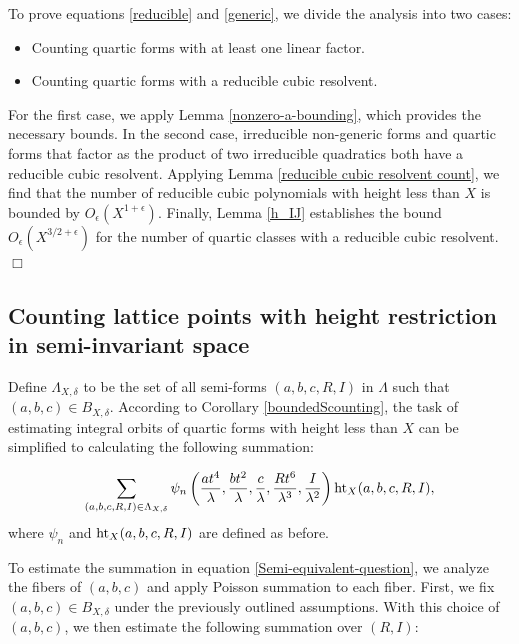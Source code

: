 \documentclass{article}
\def \h{{\rm ht}}
\newenvironment{customproof}[1][]
{\par\noindent{\textbf{Proof of #1:}}\quad}
{$\Box$ \vspace{2 ex}}
\begin{document}
\begin{customproof}[Lemma \ref{lemma for reducibility lemma}] To prove equations \eqref{reducible} and \eqref{generic}, we divide the analysis into two cases:
\begin{itemize}
    \item Counting quartic forms with at least one linear factor.
    \item Counting quartic forms with a reducible cubic resolvent.
\end{itemize}
For the first case, we apply Lemma \ref{nonzero-a-bounding}, which provides the necessary bounds. In the second case, irreducible non-generic forms and quartic forms that factor as the product of two irreducible quadratics both have a reducible cubic resolvent. Applying Lemma \ref{reducible cubic resolvent count}, we find that the number of reducible cubic polynomials with height less than $X$ is bounded by $O_{\epsilon}(X^{1+\epsilon})$. Finally, Lemma \ref{h_IJ} establishes the bound $O_{\epsilon}(X^{3/2+\epsilon})$ for the number of quartic classes with a reducible cubic resolvent.
\end{customproof}


\subsection{Counting lattice points with height restriction in semi-invariant space}
Define $\Lambda_{X, \delta}$ to be the set of all semi-forms $(a, b, c, R, I)$ in $\Lambda$ such that $(a, b, c) \in B_{X, \delta}$. According to Corollary \ref{boundedScounting}, the task of estimating integral orbits of quartic forms with height less than $X$ can be simplified to calculating the following summation:

\begin{equation}\label{Semi-equivalent-question} \sum_{(a, b, c, R, I) \in \Lambda_{X, \delta}} \psi_{n} \left( \frac{at^4}{\lambda}, \frac{bt^2}{\lambda}, \frac{c}{\lambda}, \frac{Rt^6}{\lambda^3}, \frac{I}{\lambda^2} \right) \h_X(a, b, c, R, I), \end{equation} where $\psi_{n}$ and $\h_X(a, b, c, R, I)$ are defined as before.

To estimate the summation in equation \eqref{Semi-equivalent-question}, we analyze the fibers of $(a, b, c)$ and apply Poisson summation to each fiber. First, we fix $(a, b, c) \in B_{X, \delta}$ under the previously outlined assumptions. With this choice of $(a, b, c)$, we then estimate the following summation over $(R, I)$:
\end{document}
